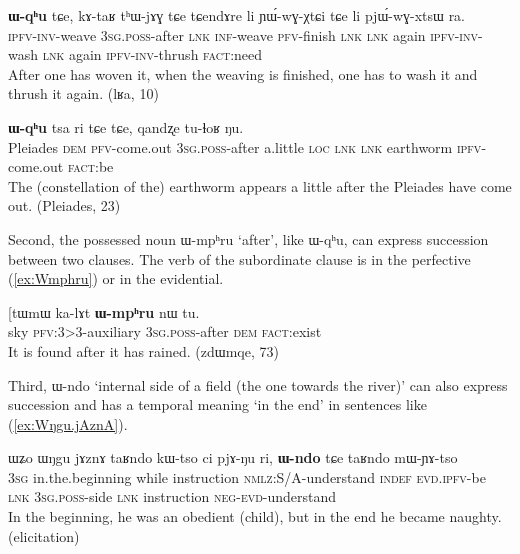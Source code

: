 \documentclass[oldfontcommands,oneside,a4paper,11pt]{article}
\newcommand{\ipa}[1]{{\phon \mbox{#1}}} %
\newcommand{\refb}[1]{(\ref{#1})}
\begin{document}
\begin{exe}
\ex \label{ex:chWGtaR}
\gll 
[\ipa{cʰɯ́-wɣ-taʁ}]   	\textbf{\ipa{ɯ-qʰu}}  	\ipa{tɕe,}   	\ipa{kɤ-taʁ}   	\ipa{tʰɯ-jɤɣ}   	\ipa{tɕe}   	\ipa{tɕendɤre}   	\ipa{li}   	\ipa{ɲɯ́-wɣ-χtɕi}   	\ipa{tɕe}   	\ipa{li}   	\ipa{pjɯ́-wɣ-xtsɯ}   	\ipa{ra.}   \\
\textsc{ipfv-inv}-weave \textsc{3sg.poss}-after \textsc{lnk} \textsc{inf}-weave \textsc{pfv}-finish \textsc{lnk} \textsc{lnk} again \textsc{ipfv-inv}-wash \textsc{lnk} again
\textsc{ipfv-inv}-thrush \textsc{fact}:need \\
\glt After one has woven it, when the weaving is finished, one has to wash it and thrush it again. (lʁa, 10)
\end{exe}



\begin{exe}
\ex \label{ex:smWntsxWG}
\gll 
[\ipa{smɯntʂɯɣ}	\ipa{nɯnɯ}   	\ipa{tɤ-ɬoʁ}]   	\textbf{\ipa{ɯ-qʰu}}   	\ipa{tsa}   	\ipa{ri}   	\ipa{tɕe}   	\ipa{tɕe,}   	\ipa{qandʐe}   	\ipa{tu-ɬoʁ}   	\ipa{ŋu.}   \\
Pleiades \textsc{dem} \textsc{pfv}-come.out \textsc{3sg.poss}-after a.little \textsc{loc} \textsc{lnk} \textsc{lnk} earthworm \textsc{ipfv}-come.out \textsc{fact}:be \\
\glt The (constellation of the) earthworm appears a little after the Pleiades have come out.  (Pleiades, 23)
\end{exe}



Second, the possessed noun \ipa{ɯ-mpʰru} `after', like \ipa{ɯ-qʰu}, can express succession between two clauses. The verb of the subordinate clause is in the perfective \refb{ex:Wmphru} or in the evidential.


\begin{exe}
\ex \label{ex:Wmphru}
\gll  [\ipa{tɯmɯ}   	\ipa{ka-lɤt}   	\textbf{\ipa{ɯ-mpʰru}}  	\ipa{nɯ}   	\ipa{tu.}     \\
 sky \textsc{pfv}:3>3-auxiliary 3\textsc{sg.poss}-after \textsc{dem} \textsc{fact}:exist \\
\glt  It is found after it has rained. (zdɯmqe, 73)
\end{exe}

Third,  \ipa{ɯ-ndo} `internal side of a field (the one towards the river)' can also express  succession and has a temporal meaning `in the end' in sentences like \refb{ex:Wŋgu.jAznA}.

\begin{exe}
\ex \label{ex:Wŋgu.jAznA}
\gll 
\ipa{ɯʑo}  	\ipa{ɯŋgu}  	\ipa{jɤznɤ}  	\ipa{taʁndo}  	\ipa{kɯ-tso}  	\ipa{ci}  	\ipa{pjɤ-ŋu}  	\ipa{ri,}  	\ipa{\textbf{ɯ-ndo}}  	\ipa{tɕe}  	\ipa{taʁndo}  	\ipa{mɯ-ɲɤ-tso}  	\\
\textsc{3sg} in.the.beginning while instruction \textsc{nmlz}:S/A-understand \textsc{indef} \textsc{evd.ipfv}-be \textsc{lnk} \textsc{3sg.poss}-side \textsc{lnk} instruction \textsc{neg-evd}-understand \\
\glt In the beginning, he was an obedient (child), but in the end he became naughty. (elicitation)
\end{exe}
\end{document}
